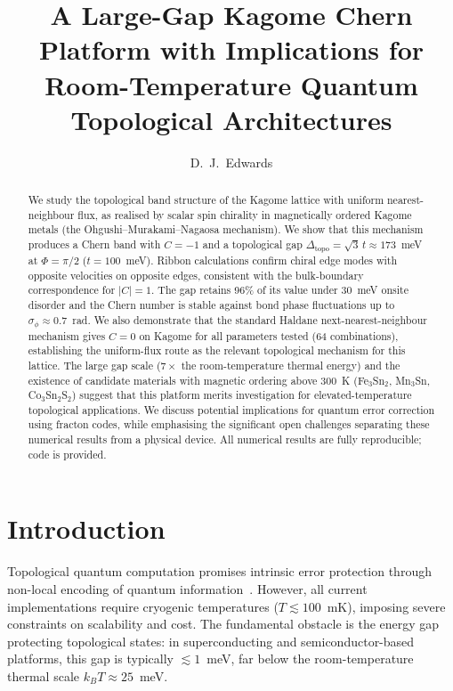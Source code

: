 \documentclass[aps,prb,twocolumn,superscriptaddress,floatfix]{revtex4-2}
\begin{document}
\title{A Large-Gap Kagome Chern Platform with Implications for Room-Temperature Quantum Topological Architectures}

\author{D.~J.~Edwards}

\begin{abstract}
We study the topological band structure of the Kagome lattice with uniform nearest-neighbour flux, as realised by scalar spin chirality in magnetically ordered Kagome metals (the Ohgushi--Murakami--Nagaosa mechanism). We show that this mechanism produces a Chern band with $C = -1$ and a topological gap $\Delta_{\mathrm{topo}} = \sqrt{3}\,t \approx 173$~meV at $\Phi = \pi/2$ ($t = 100$~meV). Ribbon calculations confirm chiral edge modes with opposite velocities on opposite edges, consistent with the bulk-boundary correspondence for $|C| = 1$. The gap retains 96\% of its value under 30~meV onsite disorder and the Chern number is stable against bond phase fluctuations up to $\sigma_\phi \approx 0.7$~rad. We also demonstrate that the standard Haldane next-nearest-neighbour mechanism gives $C = 0$ on Kagome for all parameters tested (64 combinations), establishing the uniform-flux route as the relevant topological mechanism for this lattice. The large gap scale ($7\times$ the room-temperature thermal energy) and the existence of candidate materials with magnetic ordering above 300~K (Fe$_3$Sn$_2$, Mn$_3$Sn, Co$_3$Sn$_2$S$_2$) suggest that this platform merits investigation for elevated-temperature topological applications. We discuss potential implications for quantum error correction using fracton codes, while emphasising the significant open challenges separating these numerical results from a physical device. All numerical results are fully reproducible; code is provided.
\end{abstract}

\maketitle

\section{Introduction}
\label{sec:intro}

Topological quantum computation promises intrinsic error protection through non-local encoding of quantum information~\cite{nayak2008}. However, all current implementations require cryogenic temperatures ($T \lesssim 100$~mK), imposing severe constraints on scalability and cost. The fundamental obstacle is the energy gap protecting topological states: in superconducting and semiconductor-based platforms, this gap is typically $\lesssim 1$~meV, far below the room-temperature thermal scale $k_BT \approx 25$~meV.
\end{document}
